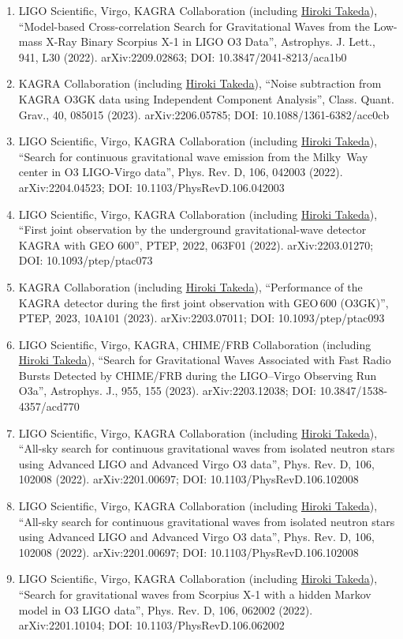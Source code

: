 \documentclass[uplatex, 12pt]{article}
\begin{document}
\begin{enumerate}
\item LIGO Scientific, Virgo, KAGRA Collaboration (including \uline{Hiroki Takeda}), “Model-based Cross-correlation Search for Gravitational Waves from the Low-mass X-Ray Binary Scorpius X-1 in LIGO O3 Data”, Astrophys. J. Lett., 941, L30 (2022). arXiv:2209.02863; DOI: 10.3847/2041-8213/aca1b0
\item KAGRA Collaboration (including \uline{Hiroki Takeda}), “Noise subtraction from KAGRA O3GK data using Independent Component Analysis”, Class. Quant. Grav., 40, 085015 (2023). arXiv:2206.05785; DOI: 10.1088/1361-6382/acc0cb
\item LIGO Scientific, Virgo, KAGRA Collaboration (including \uline{Hiroki Takeda}), “Search for continuous gravitational wave emission from the Milky~Way center in O3 LIGO-Virgo data”, Phys. Rev. D, 106, 042003 (2022). arXiv:2204.04523; DOI: 10.1103/PhysRevD.106.042003
\item LIGO Scientific, Virgo, KAGRA Collaboration (including \uline{Hiroki Takeda}), “First joint observation by the underground gravitational-wave detector KAGRA with GEO 600”, PTEP, 2022, 063F01 (2022). arXiv:2203.01270; DOI: 10.1093/ptep/ptac073
\item KAGRA Collaboration (including \uline{Hiroki Takeda}), “Performance of the KAGRA detector during the first joint observation with GEO\,600 (O3GK)”, PTEP, 2023, 10A101 (2023). arXiv:2203.07011; DOI: 10.1093/ptep/ptac093
\item LIGO Scientific, Virgo, KAGRA, CHIME/FRB Collaboration (including \uline{Hiroki Takeda}), “Search for Gravitational Waves Associated with Fast Radio Bursts Detected by CHIME/FRB during the LIGO--Virgo Observing Run O3a”, Astrophys. J., 955, 155 (2023). arXiv:2203.12038; DOI: 10.3847/1538-4357/acd770
\item LIGO Scientific, Virgo, KAGRA Collaboration (including \uline{Hiroki Takeda}), “All-sky search for continuous gravitational waves from isolated neutron stars using Advanced LIGO and Advanced Virgo O3 data”, Phys. Rev. D, 106, 102008 (2022). arXiv:2201.00697; DOI: 10.1103/PhysRevD.106.102008
\item LIGO Scientific, Virgo, KAGRA Collaboration (including \uline{Hiroki Takeda}), “All-sky search for continuous gravitational waves from isolated neutron stars using Advanced LIGO and Advanced Virgo O3 data”, Phys. Rev. D, 106, 102008 (2022). arXiv:2201.00697; DOI: 10.1103/PhysRevD.106.102008
\item LIGO Scientific, Virgo, KAGRA Collaboration (including \uline{Hiroki Takeda}), “Search for gravitational waves from Scorpius X-1 with a hidden Markov model in O3 LIGO data”, Phys. Rev. D, 106, 062002 (2022). arXiv:2201.10104; DOI: 10.1103/PhysRevD.106.062002

\end{enumerate}
\end{document}

